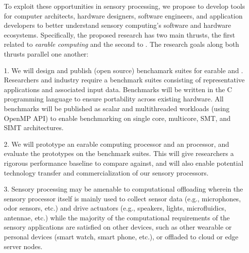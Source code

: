 To exploit these opportunities in sensory processing, we propose to develop
tools for computer architects, hardware designers, software engineers, and
application developers to better understand sensory computing's software and
hardware ecosystems.  Specifically, the proposed research has two main thrusts,
the first related to \textit{earable computing} and the second to \textit{\olfc}.
The research goals along both thrusts parallel one another:

1. We will design and publish (open source) benchamark suites for earable and
\olfc{}.  Researchers and industry require a benchmark suites
consisting of representative applications and associated input data.  Benchmarks
will be written in the C programming language to ensure portability across
existing hardware.  All benchmarks will be published as scalar
and multithreaded workloads (using OpenMP API) to enable benchmarking on single
core, multicore, SMT, and SIMT architectures.

2. We will prototype an earable computing processor and an \olfc{}
processor, and evaluate the prototypes on the benchmark suites.  This will
give researchers a rigorous performance baseline to compare against, and will
also enable potential technology transfer and commercialization of our sensory
processors.

3. Sensory processing may be amenable to computational offloading wherein the
sensory processor itself is mainly used to collect sensor data (e.g.,
microphones, odor sensors, etc.) and drive actuators (e.g., speakers, lights,
microfluidics, antennae, etc.) while the majority of the computational
requirements of the sensory applications are satisfied on other devices, such
as other wearable or personal devices (smart watch, smart phone, etc.), or
offladed to cloud or edge server nodes.
